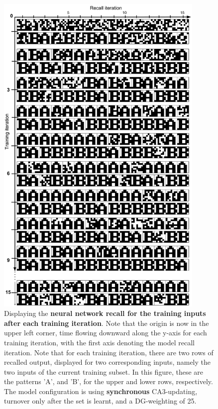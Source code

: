 \begin{figure}
    \centering
    \includegraphics[width=10cm]{fig/AB-pattern-associations-sync-tm0-dgw25}
    \caption{Displaying the \textbf{neural network recall for the training inputs after each training iteration}. Note that the origin is now in the upper left corner, time flowing downward along the y-axis for each training iteration, with the first axis denoting the model recall iteration. Note that for each training iteration, there are two rows of recalled output, displayed for two corresponding inputs, namely the two inputs of the current training subset. In this figure, these are the patterns 'A', and 'B', for the upper and lower rows, respectively. The model configuration is using \textbf{synchronous} CA3-updating, turnover only after the set is learnt, and a DG-weighting of 25.}
    \label{fig:pattern_associations_sync}
\end{figure}

